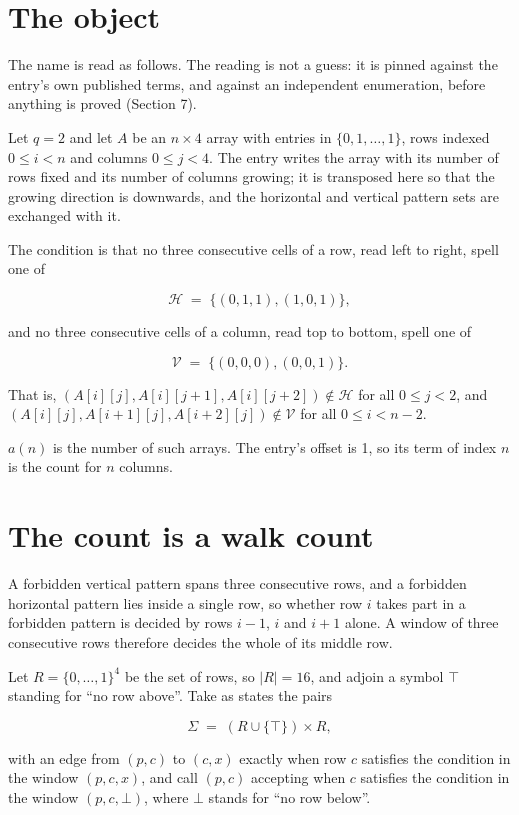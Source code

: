 \documentclass[11pt]{article}
\theoremstyle{definition}
\begin{document}
\section{The object}

The name is read as follows. The reading is not a guess: it is pinned against the entry's own published terms, and against an independent enumeration, before anything is proved (Section 7).

Let $q = 2$ and let $A$ be an $n \times 4$ array with entries in $\{0,1,\dots,1\}$, rows indexed $0 \le i < n$ and columns $0 \le j < 4$. The entry writes the array with its number of rows fixed and its number of columns growing; it is transposed here so that the growing direction is downwards, and the horizontal and vertical pattern sets are exchanged with it.

The condition is that no three consecutive cells of a row, read left to right, spell one of

\[\mathcal{H} \;=\; \{(0,1,1), (1,0,1)\},\]

and no three consecutive cells of a column, read top to bottom, spell one of

\[\mathcal{V} \;=\; \{(0,0,0), (0,0,1)\}.\]

That is, $(A[i][j],A[i][j{+}1],A[i][j{+}2]) \notin \mathcal{H}$ for all $0 \le j < 2$, and $(A[i][j],A[i{+}1][j],A[i{+}2][j]) \notin \mathcal{V}$ for all $0 \le i < n-2$.

$a(n)$ is the number of such arrays. The entry's offset is 1, so its term of index $n$ is the count for $n$ columns.

\section{The count is a walk count}

A forbidden vertical pattern spans three consecutive rows, and a forbidden horizontal pattern lies inside a single row, so whether row $i$ takes part in a forbidden pattern is decided by rows $i-1$, $i$ and $i+1$ alone. A window of three consecutive rows therefore decides the whole of its middle row.

Let $R = \{0,\dots,1\}^{4}$ be the set of rows, so $|R| = 16$, and adjoin a symbol $\top$ standing for ``no row above''. Take as states the pairs

\[\Sigma \;=\; (R \cup \{\top\}) \times R,\]

with an edge from $(p,c)$ to $(c,x)$ exactly when row $c$ satisfies the condition in the window $(p,c,x)$, and call $(p,c)$ accepting when $c$ satisfies the condition in the window $(p,c,\bot)$, where $\bot$ stands for ``no row below''.
\end{document}
